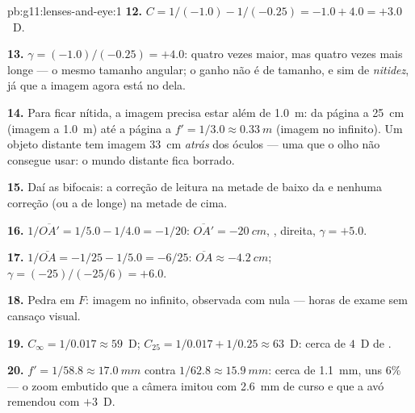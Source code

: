 \begin{solution}{pb:g11:lenses-and-eye:1}
\textbf{12.} $C = 1/(-1.0) - 1/(-0.25) = -1.0 + 4.0 = +3.0$~D.

\textbf{13.} $\gamma = (-1.0)/(-0.25) = +4.0$: quatro vezes maior, mas
quatro vezes mais longe --- o mesmo tamanho angular; o ganho não é de
tamanho, e sim de \emph{nitidez}, já que a imagem agora está no  dela.

\textbf{14.} Para ficar nítida, a imagem precisa estar além de
\qty{1.0}{m}: da página a \qty{25}{cm} (imagem a \qty{1.0}{m}) até a
página a $f' = 1/3.0 \approx \qty{0.33}{m}$ (imagem no infinito). Um
objeto distante tem imagem \qty{33}{cm} \emph{atrás} dos óculos --- uma
 que o olho não consegue usar: o mundo distante fica borrado.

\textbf{15.} Daí as  bifocais: a correção de leitura na metade de
baixo da  e nenhuma correção (ou a de longe) na metade de cima.

\textbf{16.} $1/\overline{OA'} = 1/5.0 - 1/4.0 = -1/20$:
$\overline{OA'} = \qty{-20}{cm}$, , direita, $\gamma = +5.0$.

\textbf{17.} $1/\overline{OA} = -1/25 - 1/5.0 = -6/25$:
$\overline{OA} \approx \qty{-4.2}{cm}$;
$\gamma = (-25)/(-25/6) = +6.0$.

\textbf{18.} Pedra em $F$: imagem no infinito, observada com 
nula --- horas de exame sem cansaço visual.

\textbf{19.} $C_\infty = 1/0.017 \approx 59$~D;
$C_{25} = 1/0.017 + 1/0.25 \approx 63$~D: cerca de $4$~D de .

\textbf{20.} $f' = 1/58.8 \approx \qty{17.0}{mm}$ contra
$1/62.8 \approx \qty{15.9}{mm}$: cerca de \qty{1.1}{mm}, uns $6\%$ --- o
zoom embutido que a câmera imitou com \qty{2.6}{mm} de curso e que a avó
remendou com $+3$~D.
\end{solution}
